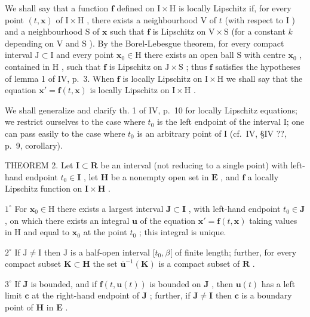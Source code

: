 We shall say that a function \(\mathbf{f}\) defined on \(\mathrm{I} \times \mathrm{H}\) is locally Lipschitz if, for every point \((t, \mathbf{x})\) of \(\mathrm{I} \times \mathrm{H}\) , there exists a neighbourhood \(\mathrm{V}\) of \(t\) (with respect to \(\mathrm{I}\) ) and a neighbourhood \(\mathrm{S}\) of \(\mathbf{x}\) such that \(\mathbf{f}\) is Lipschitz on \(\mathrm{V} \times \mathrm{S}\) (for a constant \(k\) depending on \(\mathrm{V}\) and \(\mathrm{S}\) ). By the Borel-Lebesgue theorem, for every compact interval \(\mathrm{J} \subset \mathrm{I}\) and every point \(\mathbf{x}_0 \in \mathrm{H}\) there exists an open ball \(\mathrm{S}\) with centre \(\mathbf{x}_0\) , contained in \(\mathrm{H}\) , such that \(\mathbf{f}\) is Lipschitz on \(\mathrm{J} \times \mathrm{S}\) ; thus \(\mathbf{f}\) satisfies the hypotheses of lemma 1 of IV, p.~3. When \(\mathbf{f}\) is locally Lipschitz on \(\mathrm{I} \times \mathrm{H}\) we shall say that the equation \(\mathbf{x}' = \mathbf{f}(t, \mathbf{x})\) is locally Lipschitz on \(\mathrm{I} \times \mathrm{H}\) .

We shall generalize and clarify th. 1 of IV, p.~10 for locally Lipschitz equations; we restrict ourselves to the case where \(t_0\) is the left endpoint of the interval I; one can pass easily to the case where \(t_0\) is an arbitrary point of I (cf.~IV, §IV ??, p.~9, corollary).

THEOREM 2. Let \(\mathbf{I} \subset \mathbf{R}\) be an interval (not reducing to a single point) with left-hand endpoint \(t_0 \in \mathbf{I}\) , let \(\mathbf{H}\) be a nonempty open set in \(\mathbf{E}\) , and \(\mathbf{f}\) a locally Lipschitz function on \(\mathbf{I} \times \mathbf{H}\) .

\(1^{\circ}\) For \(\mathbf{x}_0\in \mathrm{H}\) there exists a largest interval \(\mathbf{J}\subset \mathbf{I}\) , with left-hand endpoint \(t_0\in \mathbf{J}\) , on which there exists an integral \(\mathbf{u}\) of the equation \(\mathbf{x}' = \mathbf{f}(t,\mathbf{x})\) taking values in H and equal to \(\mathbf{x}_0\) at the point \(t_0\) ; this integral is unique.

\(2^{\circ}\) If \(\mathrm{J} \neq \mathrm{I}\) then \(\mathrm{J}\) is a half-open interval \([t_0, \beta[\) of finite length; further, for every compact subset \(\mathbf{K} \subset \mathbf{H}\) the set \(\overline{\mathbf{u}}^{-1}(\mathbf{K})\) is a compact subset of \(\mathbf{R}\) .

\(3^{\circ}\) If \(\mathbf{J}\) is bounded, and if \(\mathbf{f}(t,\mathbf{u}(t))\) is bounded on \(\mathbf{J}\) , then \(\mathbf{u}(t)\) has a left limit \(\mathbf{c}\) at the right-hand endpoint of \(\mathbf{J}\) ; further, if \(\mathbf{J} \neq \mathbf{I}\) then \(\mathbf{c}\) is a boundary point of \(\mathbf{H}\) in \(\mathbf{E}\) .

